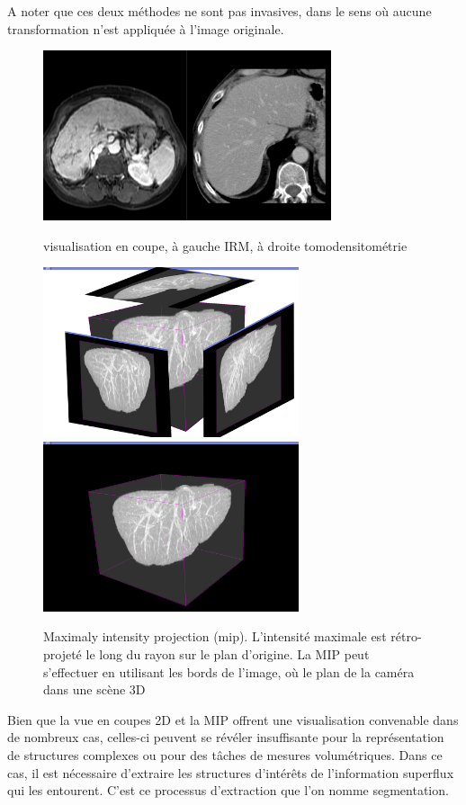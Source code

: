 A noter que ces deux méthodes ne sont pas invasives, dans le sens où aucune transformation n'est appliquée à l'image originale.

\begin{figure}
  \centering
  \includegraphics[height=5cm]{Images/2D_view.png}
  \label{fig:visualisation en coupe}
  \caption{visualisation en coupe, à gauche IRM, à droite tomodensitométrie}
\end{figure}

\begin{figure}
  \centering
  \includegraphics[height=5cm]{Images/3D_mip_montage.png}
  \includegraphics[height=5cm]{Images/3D_mip.png}
  \label{fig:visualisation MIP}
  \caption{Maximaly intensity projection (mip). L'intensité maximale est rétro-projeté le long du rayon sur le plan d'origine. La MIP peut s'effectuer en utilisant les bords de l'image, où le plan de la caméra dans une scène 3D}
\end{figure}

Bien que la vue en coupes 2D et la MIP offrent une visualisation convenable dans de nombreux cas, celles-ci peuvent se révéler insuffisante pour la représentation de structures complexes ou pour des tâches de mesures volumétriques. Dans ce cas, il est nécessaire d'extraire les structures d'intérêts de l'information superflux qui les entourent. C'est ce processus d'extraction que l'on nomme segmentation.

